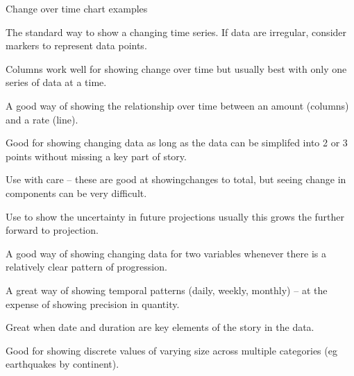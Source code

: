 \documentclass[letterpaper,10pt,english]{jupyterBook}
\begin{document}
\sphinxAtStartPar
{}

\sphinxAtStartPar
Change over time chart examples

\sphinxAtStartPar
{} The standard way to show a changing time series. If data are irregular, consider markers to represent
data points.

\sphinxAtStartPar
{} Columns work well for showing change over time \sphinxhyphen{} but usually best with only one series of data at a time.

\sphinxAtStartPar
{} A good way of showing the relationship over time between an amount (columns) and a rate (line).

\sphinxAtStartPar
{} Good for showing changing data as long as the data can be simplifed into 2 or 3 points without missing a key part of story.

\sphinxAtStartPar
{} Use with care – these are good at showingchanges to total, but seeing change in components can be very difficult.

\sphinxAtStartPar
{} Use to show the uncertainty in future projections \sphinxhyphen{} usually this grows the further forward to projection.

\sphinxAtStartPar
{} A good way of showing changing data for two variables whenever there is a relatively clear pattern of progression.

\sphinxAtStartPar
{} A great way of showing temporal patterns (daily, weekly, monthly) – at the expense of showing precision in quantity.

\sphinxAtStartPar
{} Great when date and duration are key elements of the story in the data.

\sphinxAtStartPar
{} Good for showing discrete values of varying size across multiple categories (eg earthquakes by continent).
\end{document}
